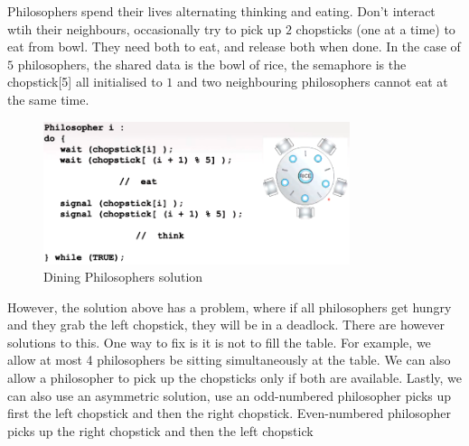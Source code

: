 \documentclass[a4paper]{article}
\theoremstyle{plain}
\theoremstyle{definition}
\newtheorem{defn}{Definition}[section]
\theoremstyle{remark}
\begin{document}
\begin{tcolorbox}[colback=black!3!white,colframe=black!60!white,title=\begin{defn}Dining Philosophers \label{Dining Philosophers}\end{defn}]
Philosophers spend their lives alternating thinking and eating. Don't interact wtih their neighbours, occasionally try to pick up $2$ chopsticks (one at a time) to eat from bowl. They need both to eat, and release both when done. In the case of $5$ philosophers, the shared data is the bowl of rice, the semaphore is the chopstick[5] all initialised to $1$ and two neighbouring philosophers cannot eat at the same time.
\begin{figure}[H]
	\centering
	\includegraphics[width=0.8\textwidth]{fiftyfour.png}
	\caption{Dining Philosophers solution}
	\label{fig:fiftyfour-png}
\end{figure}
However, the solution above has a problem, where if all philosophers get hungry and they grab the left chopstick, they will be in a deadlock. There are however solutions to this. One way to fix is it is not to fill the table. For example, we allow at most 4 philosophers be sitting simultaneously at the table. We can also allow a philosopher to pick up the chopsticks only if both are available. Lastly, we can also use an asymmetric solution, use an odd-numbered philosopher picks up first the left chopstick and then the right chopstick. Even-numbered philosopher picks up the right chopstick and then the left chopstick
\end{tcolorbox}
\end{document}
